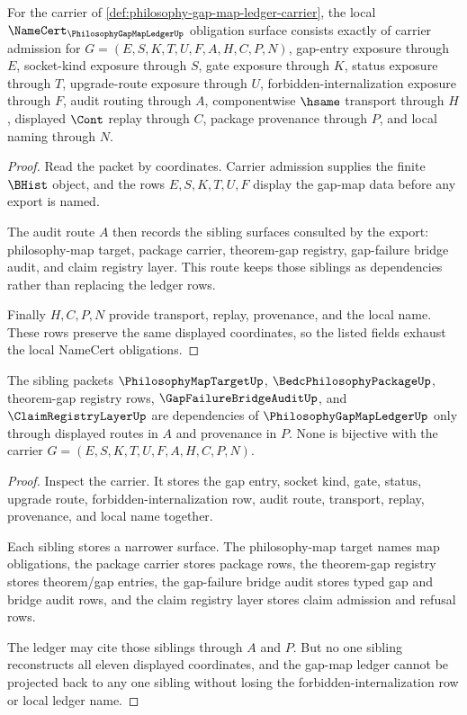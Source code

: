 \begin{theorem}
\label{thm:philosophy-gap-map-ledger-namecert-obligations}
For the carrier of \autoref{def:philosophy-gap-map-ledger-carrier}, the local $\NameCert_{\PhilosophyGapMapLedgerUp}$ obligation surface consists exactly of carrier admission for $G=(E,S,K,T,U,F,A,H,C,P,N)$, gap-entry exposure through $E$, socket-kind exposure through $S$, gate exposure through $K$, status exposure through $T$, upgrade-route exposure through $U$, forbidden-internalization exposure through $F$, audit routing through $A$, componentwise $\hsame$ transport through $H$, displayed $\Cont$ replay through $C$, package provenance through $P$, and local naming through $N$.
\end{theorem}
\begin{proof}
Read the packet by coordinates. Carrier admission supplies the finite $\BHist$ object, and the rows $E,S,K,T,U,F$ display the gap-map data before any export is named.

The audit route $A$ then records the sibling surfaces consulted by the export: philosophy-map target, package carrier, theorem-gap registry, gap-failure bridge audit, and claim registry layer. This route keeps those siblings as dependencies rather than replacing the ledger rows.

Finally $H,C,P,N$ provide transport, replay, provenance, and the local name. These rows preserve the same displayed coordinates, so the listed fields exhaust the local NameCert obligations.
\end{proof}

\begin{theorem}
\label{thm:philosophy-gap-map-ledger-sibling-independence}
The sibling packets $\PhilosophyMapTargetUp$, $\BedcPhilosophyPackageUp$, theorem-gap registry rows, $\GapFailureBridgeAuditUp$, and $\ClaimRegistryLayerUp$ are dependencies of $\PhilosophyGapMapLedgerUp$ only through displayed routes in $A$ and provenance in $P$. None is bijective with the carrier $G=(E,S,K,T,U,F,A,H,C,P,N)$.
\end{theorem}
\begin{proof}
Inspect the carrier. It stores the gap entry, socket kind, gate, status, upgrade route, forbidden-internalization row, audit route, transport, replay, provenance, and local name together.

Each sibling stores a narrower surface. The philosophy-map target names map obligations, the package carrier stores package rows, the theorem-gap registry stores theorem/gap entries, the gap-failure bridge audit stores typed gap and bridge audit rows, and the claim registry layer stores claim admission and refusal rows.

The ledger may cite those siblings through $A$ and $P$. But no one sibling reconstructs all eleven displayed coordinates, and the gap-map ledger cannot be projected back to any one sibling without losing the forbidden-internalization row or local ledger name.
\end{proof}

